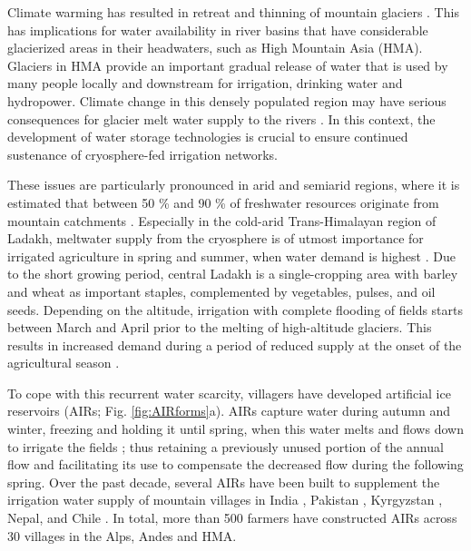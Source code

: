 \documentclass[tc, manuscript]{copernicus}
\begin{document}

\introduction

Climate warming has resulted in retreat and thinning of mountain glaciers
\citep{ipccCrossChapterPaperMountains2022}. This has implications for water availability in river basins that
have considerable glacierized areas in their headwaters, such as High Mountain Asia (HMA). Glaciers in HMA
provide an important gradual release of water that is used by many people locally and downstream for irrigation,
drinking water and hydropower. Climate change in this densely populated region may have serious consequences for
glacier melt water supply to the rivers \citep{immerzeelImportanceVulnerabilityWorld2020}. In this context, the
development of water storage technologies is crucial to ensure continued sustenance of cryosphere-fed irrigation
networks.

These issues are particularly pronounced in arid and semiarid regions, where it is estimated that between 50 \%
and 90 \% of freshwater resources originate from mountain catchments
\citep{mukhopadhyayReevaluationSnowmeltGlacial2015}. Especially in the cold-arid Trans-Himalayan region of
Ladakh, meltwater supply from the cryosphere is of utmost importance for irrigated agriculture in spring and
summer, when water demand is highest . Due to the short growing period, central Ladakh is a single-cropping area
with barley and wheat as important staples, complemented by vegetables, pulses, and oil seeds. Depending on the
altitude, irrigation with complete flooding of fields starts between March and April prior to the melting of
high-altitude glaciers. This results in increased demand during a period of reduced supply at the onset of the
agricultural season \citep{nusserSociohydrologyArtificialGlaciers2019,
nusserCryosphereFedIrrigationNetworks2019}.

To cope with this recurrent water scarcity, villagers have developed artificial ice reservoirs (AIRs; Fig.
\ref{fig:AIRforms}a). AIRs capture water during autumn and winter, freezing and holding it until spring, when
this water melts and flows down to irrigate the fields \citep{ipccChapterHighMountain2019, vinceGlacierMan2009,
clouseLadakhArtificialGlaciers2017, nusserSociohydrologyArtificialGlaciers2019}; thus retaining a previously
unused portion of the annual flow and facilitating its use to compensate the decreased flow during the following
spring. Over the past decade, several AIRs have been built to supplement the irrigation water supply of mountain
villages in India \citep{wangchukIceStupaCompetition2020, palmerStoringFrozenWater2022,
aggarwalAdaptationClimateChange2021}, Pakistan \citep{awazproductionIceStupaArtificial2022}, Kyrgyzstan
\citep{bbcnewsBrightArtificialGlacier2020}, Nepal, and Chile \citep{reutersConservationistsChileAim2021}. In
total, more than 500 farmers have constructed AIRs across 30 villages in the Alps, Andes and HMA.
\end{document}
